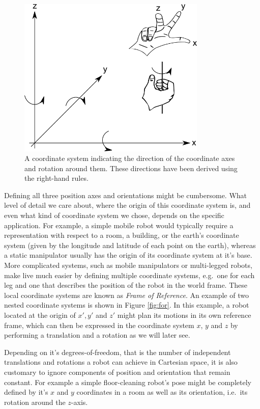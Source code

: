 \begin{figure}
	\centering
		\includegraphics[width=0.8\textwidth]{figs/coordinatesystem.png}
	\caption{A coordinate system indicating the direction of the coordinate axes and rotation around them. These directions have been derived using the right-hand rules.}
	\label{fig:coordinatesystem}
\end{figure}

Defining all three position axes and orientations might be cumbersome. What level of detail we care about, where the origin of this coordinate system is, and even what kind of coordinate system we chose, depends on the specific application. For example, a simple mobile robot would typically require a representation with respect to a room, a building, or the earth's coordinate system (given by the longitude and latitude of each point on the earth), whereas a static manipulator usually has the origin of its coordinate system at it's base. More complicated systems, such as mobile manipulators or multi-legged robots, make live much easier by defining multiple coordinate systems, e.g.\ one for each leg and one that describes the position of the robot in the world frame. These local coordinate systems are known as \emph{Frame of Reference}. An example of two nested coordinate systems is shown in Figure \ref{fig:for}. In this example, a robot located at the origin of $x',y'$ and $z'$ might plan its motions in its own reference frame, which can then be expressed in the coordinate system $x$, $y$ and $z$ by performing a translation and a rotation as we will later see. 

Depending on it's degrees-of-freedom, that is the number of independent translations and rotations a robot can achieve in Cartesian space, it is also customary to ignore components of position and orientation that remain constant. For example a simple floor-cleaning robot's pose might be completely defined by it's $x$ and $y$ coordinates in a room as well as its orientation, i.e.\ its rotation around the $z$-axis. 


